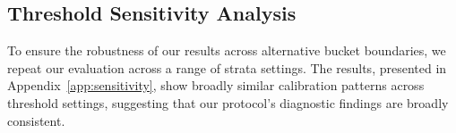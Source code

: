 \subsection{Threshold Sensitivity Analysis}
To ensure the robustness of our results across alternative bucket boundaries, we repeat our evaluation across a range of strata settings. The results, presented in Appendix~\ref{app:sensitivity}, show broadly similar calibration patterns across threshold settings, suggesting that our protocol's diagnostic findings are broadly consistent.
